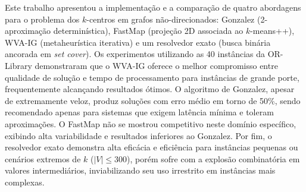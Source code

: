 \documentclass[12pt]{article}
\begin{document}
Este trabalho apresentou a implementação e a comparação de quatro abordagens para o problema dos $k$-centros em grafos não-direcionados: Gonzalez (2-aproximação determinística), FastMap (projeção 2D associada ao $k$-means++), WVA-IG (metaheurística iterativa) e um resolvedor exato (busca binária ancorada em \textit{set cover}). Os experimentos utilizando as 40 instâncias da OR-Library demonstraram que o WVA-IG oferece o melhor compromisso entre qualidade de solução e tempo de processamento para instâncias de grande porte, frequentemente alcançando resultados ótimos. O algoritmo de Gonzalez, apesar de extremamente veloz, produz soluções com erro médio em torno de 50\%, sendo recomendado apenas para sistemas que exigem latência mínima e toleram aproximações. O FastMap não se mostrou competitivo neste domínio específico, exibindo alta variabilidade e resultados inferiores ao Gonzalez. Por fim, o resolvedor exato demonstra alta eficácia e eficiência para instâncias pequenas ou cenários extremos de $k$ ($|V| \leq 300$), porém sofre com a explosão combinatória em valores intermediários, inviabilizando seu uso irrestrito em instâncias mais complexas.



\end{document}
